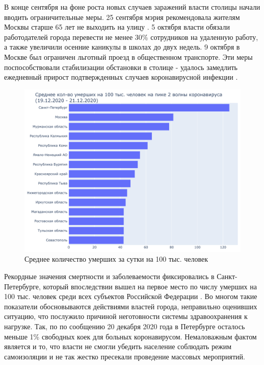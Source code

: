 \documentclass[a4paper, 12pt]{extarticle}
\begin{document}
В конце сентября на фоне роста новых случаев заражений власти столицы начали вводить ограничительные меры. 25 сентября мэрия рекомендовала жителям Москвы старше 65 лет не выходить на улицу . 5 октября власти обязали работодателей города перевести не менее 30\% сотрудников на удаленную работу, а также увеличили осенние каникулы в школах до двух недель. 9 октября в Москве был ограничен льготный проезд в общественном транспорте. Эти меры поспособствовали стабилизации обстановки в столице - удалось замедлить ежедневный прирост подтвержденных случаев коронавирусной инфекции .

\begin{figure}[h]
    \centering
    \includegraphics[scale=0.6]{../plots/6total_deaths_per_100k_bar_plot_2wave.pdf}
    \caption{Среднее количество умерших за сутки на 100 тыс. человек}
    \label{fig:average_deaths_per_100k_2wave}
\end{figure}

Рекордные значения смертности и заболеваемости фиксировались в Санкт-Петербурге, который впоследствии вышел на первое место по числу умерших на 100 тыс. человек среди всех субъектов Российской Федерации . Во многом такие показатели обосновываются действиями властей города, неправильно оценивших ситуацию, что послужило причиной неготовности системы здравоохранения к нагрузке. Так, по по сообщению 20 декабря 2020 года в Петербурге осталось меньше 1\% свободных коек для больных коронавирусом. Немаловажным фактом является и то, что власти не смогли убедить население соблюдать режим самоизоляции и не так жестко пресекали проведение массовых мероприятий.
\\
\end{document}
